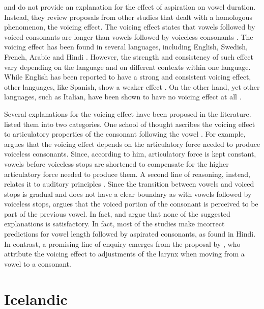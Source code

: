 \documentclass[11pt,a4paper,openany]{memoir}\usepackage[]{graphicx}\usepackage[]{color}
\begin{document}
\citet{maddieson1976} and \citet{durvasula2012} do not provide an explanation for the effect of aspiration on vowel duration.
Instead, they review proposals from other studies that dealt with a homologous phenomenon, the voicing effect.
The voicing effect states that vowels followed by voiced consonants are longer than vowels followed by voiceless consonants \citep{house1953,chen1970,hussein1994,durvasula2012}.
The voicing effect has been found in several languages, including English, Swedish, French, Arabic and Hindi \citep[191]{soskuthy2013}.
However, the strength and consistency of such effect vary depending on the language and on different contexts within one language.
While English has been reported to have a strong and consistent voicing effect, other languages, like Spanish, show a weaker effect \citep{hussein1994}.
On the other hand, yet other languages, such as Italian, have been shown to have no voicing effect at all \citep{esposito2002}.

Several explanations for the voicing effect have been proposed in the literature.
\citet{soskuthy2013} listed them into two categories.
One school of thought ascribes the voicing effect to articulatory properties of the consonant following the vowel \citep{belasco1953,chen1970}.
For example, \citep{belasco1953} argues that the voicing effect depends on the articulatory force needed to produce voiceless consonants.
Since, according to him, articulatory force is kept constant, vowels before voiceless stops are shortened to compensate for the higher articulatory force needed to produce them.
A second line of reasoning, instead, relates it to auditory principles \citep{javkin1976,kluender1988}.
Since the transition between vowels and voiced stops is gradual and does not have a clear boundary as with vowels followed by voiceless stops, \citep{javkin1976} argues that the voiced portion of the consonant is perceived to be part of the previous vowel.
In fact, \citet{maddieson1976} and \citet{durvasula2012} argue that none of the suggested explanations is satisfactory.
In fact, most of the studies make incorrect predictions for vowel length followed by aspirated consonants, as found in Hindi.
In contrast, a promising line of enquiry emerges from the proposal by \citet{chomsky1968}, who attribute the voicing effect to adjustments of the larynx when moving from a vowel to a consonant.


\section{Icelandic}
\end{document}
